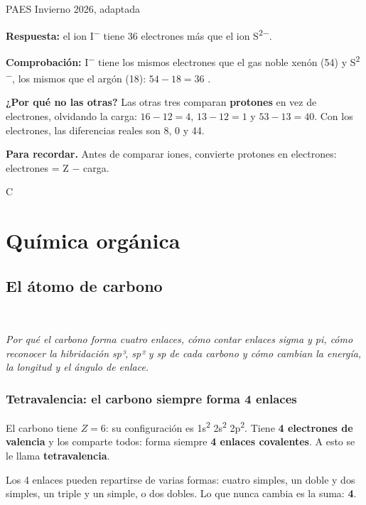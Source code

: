 \begin{elejemplo}{PAES Invierno 2026, adaptada}
{\textbf{Respuesta:} el ion I\textsuperscript{\ensuremath{-}} tiene 36 electrones más que el ion S\textsuperscript{2\ensuremath{-}}.

\textbf{Comprobación:} I\textsuperscript{\ensuremath{-}} tiene los mismos electrones que el gas noble xenón (54) y S\textsuperscript{2\ensuremath{-}}, los mismos que el argón (18): $54 - 18 = 36$ .

\textbf{¿Por qué no las otras?} Las otras tres comparan \textbf{protones} en vez de electrones, olvidando la carga: $16 - 12 = 4$, $13 - 12 = 1$ y $53 - 13 = 40$. Con los electrones, las diferencias reales son 8, 0 y 44.

\textbf{\color{cienciaD}Para recordar.} Antes de comparar iones, convierte protones en electrones: electrones = Z \ensuremath{-} carga.}{C}
\end{elejemplo}

\chapter{Química orgánica}
\section[El átomo de carbono]{El átomo de carbono}
\modcomun\ \ {\color{gris}\itshape Por qué el carbono forma cuatro enlaces, cómo contar enlaces sigma y pi, cómo reconocer la hibridación sp³, sp² y sp de cada carbono y cómo cambian la energía, la longitud y el ángulo de enlace.\par}
\subsection{Tetravalencia: el carbono siempre forma 4 enlaces}
El carbono tiene $Z = 6$: su configuración es 1s\textsuperscript{2} 2s\textsuperscript{2} 2p\textsuperscript{2}. Tiene \textbf{4 electrones de valencia} y los comparte todos: forma siempre \textbf{4 enlaces covalentes}. A esto se le llama \textbf{tetravalencia}.

 

Los 4 enlaces pueden repartirse de varias formas: cuatro simples, un doble y dos simples, un triple y un simple, o dos dobles. Lo que nunca cambia es la suma: \textbf{4}.

 

